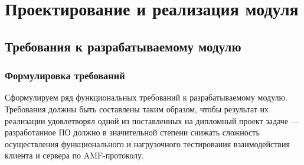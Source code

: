 \chapter{Проектирование и реализация модуля}

\section{Требования к разрабатываемому модулю}

\subsection{Формулировка требований}
Сформулируем ряд функциональных требований к разрабатываемому модулю. Требования должны быть составлены
таким образом, чтобы результат их реализации удовлетворял одной из поставленных на дипломный проект задаче ---
разработанное ПО должно в значительной степени снижать сложность осуществления функционального
и нагрузочного тестирования взаимодействия клиента и сервера по AMF-протоколу.

